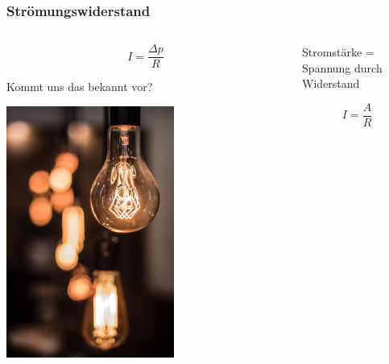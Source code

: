 \documentclass{beamer}
\begin{document}
\begin{frame}
\frametitle{Strömungswiderstand}

\begin{columns}[c]

\begin{column}{5cm}

\[
I = \frac{\Delta p}{R}
\]

Kommt uns das bekannt vor?


\pause

\begin{center}
\includegraphics[width=0.6\textwidth]{lightbulb.jpg}
\end{center}



\end{column}

\begin{column}{5cm}



Stromstärke = Spannung durch Widerstand

\[
I = \frac{A}{R}
\]

\end{column}

\end{columns}

\end{frame}
\end{document}
